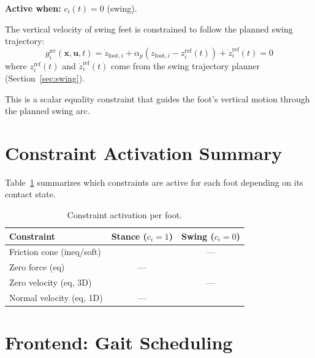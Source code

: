 \documentclass[11pt,a4paper]{article}
\begin{document}
\textbf{Active when:} $c_i(t) = 0$ (swing).

The vertical velocity of swing feet is constrained to follow the planned swing trajectory:
\begin{equation}
	\boxed{
		g_i^{\text{nv}}(\bm{x}, \bm{u}, t) = \dot{z}_{\text{foot},i} + \alpha_p(z_{\text{foot},i} - z_i^{\text{ref}}(t)) + \dot{z}_i^{\text{ref}}(t) = 0
	}
\end{equation}
where $z_i^{\text{ref}}(t)$ and $\dot{z}_i^{\text{ref}}(t)$ come from the swing trajectory planner (Section~\ref{sec:swing}).

This is a scalar equality constraint that guides the foot's vertical motion through the planned swing arc.


\section{Constraint Activation Summary}

Table~\ref{tab:constraints} summarizes which constraints are active for each foot depending on its contact state.

\begin{table}[h]
	\centering
	\caption{Constraint activation per foot.}
	\label{tab:constraints}
	\begin{tabular}{lcc}
		\toprule
		\textbf{Constraint}       & \textbf{Stance} ($c_i = 1$) & \textbf{Swing} ($c_i = 0$) \\
		\midrule
		Friction cone (ineq/soft) & \checkmark                  & ---                        \\
		Zero force (eq)           & ---                         & \checkmark                 \\
		Zero velocity (eq, 3D)    & \checkmark                  & ---                        \\
		Normal velocity (eq, 1D)  & ---                         & \checkmark                 \\
		\bottomrule
	\end{tabular}
\end{table}


\section{Frontend: Gait Scheduling}
\label{sec:gait}
\end{document}
